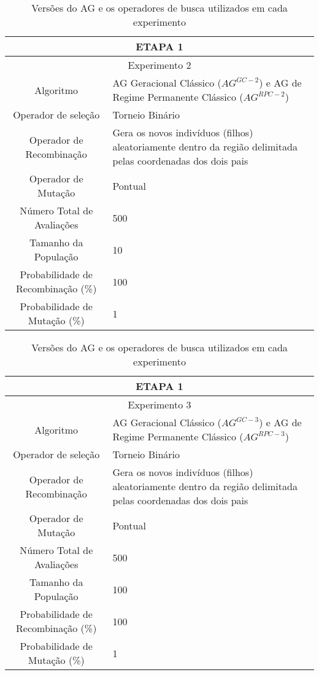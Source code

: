 \documentclass[12pt,a4paper]{report}
\begin{document}
\begin{table}[H]
\centering
\caption{Versões do AG e os operadores de busca utilizados em cada experimento}

\begin{tabular}{|c|p{10cm}|}
 \hline
 \multicolumn{2}{|c|}{ETAPA 1} \\ \hline
 \multicolumn{2}{|c|}{Experimento 2} \\ \hline
{Algoritmo} & AG Geracional Clássico ($AG^{GC-2}$) e AG de Regime Permanente Clássico ($AG^{RPC-2}$) \\ \hline
 Operador de seleção & Torneio Binário \\ \hline
 Operador de Recombinação & Gera os novos indivíduos (filhos) aleatoriamente dentro da região delimitada pelas coordenadas dos dois pais \\  \hline
 Operador de Mutação & Pontual \\ \hline
 Número Total de Avaliações & 500 \\ \hline
 Tamanho da População & 10 \\ \hline
 Probabilidade de Recombinação (\%) & 100 \\ \hline
 Probabilidade de Mutação (\%) & 1 \\ \hline 
 
\end{tabular}
\end{table} 
 
 
 \begin{table}[H]
\centering
\caption{Versões do AG e os operadores de busca utilizados em cada experimento}

 \begin{tabular}{|c|p{10cm}|}
\hline
 \multicolumn{2}{|c|}{ETAPA 1} \\ \hline
 \multicolumn{2}{|c|}{Experimento 3} \\ \hline
{Algoritmo} & AG Geracional Clássico ($AG^{GC-3}$) e AG de Regime Permanente Clássico ($AG^{RPC-3}$) \\ \hline
 Operador de seleção & Torneio Binário \\ \hline
 Operador de Recombinação & Gera os novos indivíduos (filhos) aleatoriamente dentro da região delimitada pelas coordenadas dos dois pais \\  \hline
 Operador de Mutação & Pontual \\ \hline
 Número Total de Avaliações & 500 \\ \hline
 Tamanho da População & 100 \\ \hline
 Probabilidade de Recombinação (\%) & 100 \\ \hline
 Probabilidade de Mutação (\%) & 1 \\ \hline 
 
 
 
\end{tabular}
\end{table} 
 
\end{document}
